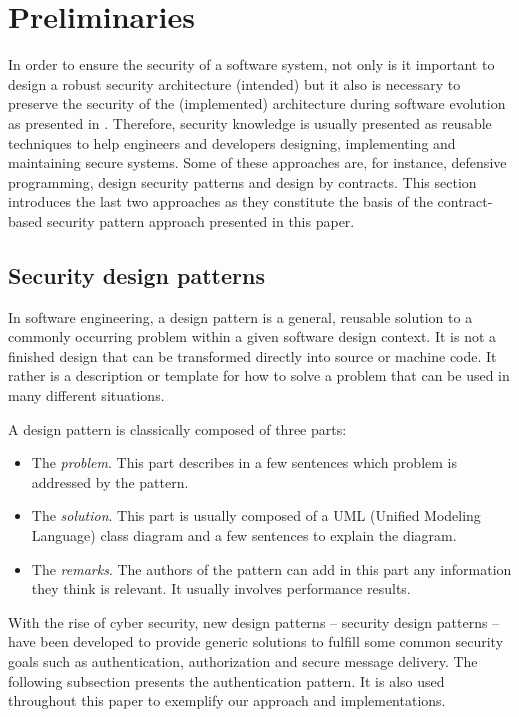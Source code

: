 \section{Preliminaries}

In order to ensure the security of a software system, not only is it important to design a robust security architecture (intended) but it also is necessary to preserve the security of the  (implemented) architecture during software evolution as presented in \cite{alferez2014dynamic}. Therefore, security knowledge is usually presented as reusable techniques to help engineers and developers designing, implementing and maintaining secure systems. Some of these approaches are, for instance, defensive programming, design security patterns and design by contracts. This section  introduces the last two approaches as they constitute the basis of the contract-based security pattern approach presented in this paper.

\subsection{Security design patterns}

In software engineering, a design pattern is a general, reusable solution to a commonly occurring problem within a given software design context. It is not a finished design that can be transformed directly into source or machine code. It rather is a description or template for how to solve a problem that can be used in many different situations.

A design pattern is classically composed of three parts:
\begin{itemize}
    \item The \emph{problem}. This part describes in a few sentences which problem is addressed by the pattern.
    
    \item The \emph{solution}. This part is usually composed of a UML (Unified Modeling Language) class diagram and a few sentences to explain the diagram.

    \item The \emph{remarks}. The authors of the pattern can add in this part any information they think is relevant. It usually involves performance results.
\end{itemize}

With the rise of cyber security, new design patterns -- security design patterns -- have been developed to provide generic solutions to fulfill some common security goals such as authentication, authorization and secure message delivery. The following subsection presents the authentication pattern. It is also used throughout this paper to exemplify our approach and implementations.

